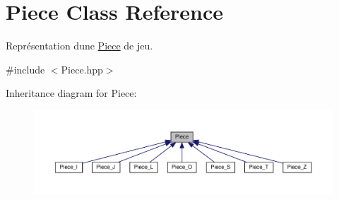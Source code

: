 \hypertarget{classPiece}{}\section{Piece Class Reference}
\label{classPiece}


Représentation d\textquotesingle{}une \hyperlink{classPiece}{Piece} de jeu.  




{\ttfamily \#include $<$Piece.\+hpp$>$}



Inheritance diagram for Piece\+:
\nopagebreak
\begin{figure}[H]
\begin{center}
\leavevmode
\includegraphics[width=350pt]{classPiece__inherit__graph}
\end{center}
\end{figure}
